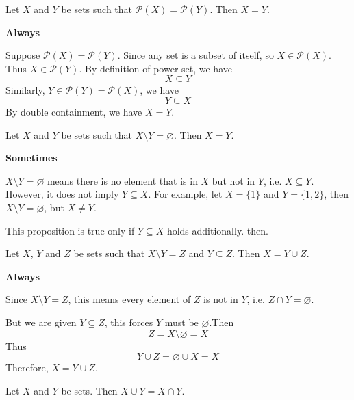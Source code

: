 \begin{chapex} %
Let $X$ and $Y$ be sets such that $\mathcal{P}(X) = \mathcal{P}(Y)$. Then $X = Y$.
\end{chapex}

\begin{mysolution}
    \textbf{Always}

    Suppose $\mathcal{P}(X) = \mathcal{P}(Y)$. Since any set is a subset of itself, so $X \in \mathcal{P}(X)$. Thus $X \in \mathcal{P}(Y)$. By definition of power set, we have
    \[X \subseteq Y\]
    Similarly, $Y \in \mathcal{P}(Y) = \mathcal{P}(X)$, we have
    \[Y \subseteq X\]
    By double containment, we have $X = Y$.
\end{mysolution}  

\begin{chapex} %
Let $X$ and $Y$ be sets such that $X \setminus Y = \varnothing$. Then $X = Y$.
\end{chapex}

\begin{mysolution}
    \textbf{Sometimes}

    $X \setminus Y = \varnothing$ means there is no element that is in $X$ but not in $Y$, i.e. $X \subseteq Y$. However, it does not imply $Y \subseteq X$.
    For example, let $X=\{1\}$ and $Y=\{1, 2\}$, then $X \setminus Y = \varnothing$, but $X \ne Y$.

    This proposition is true only if $Y \subseteq X$ holds additionally. then.
\end{mysolution}

\begin{chapex} %
Let $X$, $Y$ and $Z$ be sets such that $X \setminus Y = Z$ and $Y \subseteq Z$. Then $X = Y \cup Z$.
\end{chapex}

\begin{mysolution}
    \textbf{Always}

    Since $X \setminus Y = Z$, this means every element of $Z$ is not in $Y$, i.e. $Z \cap Y=\varnothing$.

    But we are given $Y \subseteq Z$, this forces $Y$ must be $\varnothing$.Then
    \[Z=X\setminus \varnothing=X\]
    Thus
    \[Y \cup Z=\varnothing \cup X=X\]
    Therefore, $X=Y \cup Z$.
\end{mysolution}

\begin{chapex} %
Let $X$ and $Y$ be sets. Then $X \cup Y = X \cap Y$.
\end{chapex}

